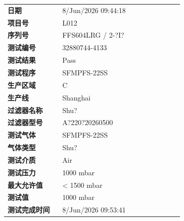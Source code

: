 \documentclass[UTF8,10pt,a4paper,fontset=fandol]{ctexart}
\newcommand{\fieldvalue}[1]{#1}
\begin{document}
\begin{tabular}{@{}p{0.28\linewidth}p{0.62\linewidth}@{}}
\textbf{日期} &
\fieldvalue{8/Jun/2026 09:44:18}
\\
\textbf{项目号} &
\fieldvalue{L012}
\\
\textbf{序列号} &
\fieldvalue{FFS604LRG / 2-?I?}
\\
\textbf{测试编号} &
\fieldvalue{32880744-4133}
\\
\textbf{测试结果} &
\fieldvalue{Pass}
\\
\textbf{测试程序} &
\fieldvalue{SFMPFS-22SS}
\\
\textbf{生产区域} &
\fieldvalue{C}
\\
\textbf{生产线} &
\fieldvalue{Shanghai}
\\
\textbf{过滤器名称} &
\fieldvalue{Shu?}
\\
\textbf{过滤器型号} &
\fieldvalue{A?220?20260500}
\\
\textbf{测试气体} &
\fieldvalue{SFMPFS-22SS}
\\
\textbf{气体类型} &
\fieldvalue{Shu?}
\\
\textbf{测试介质} &
\fieldvalue{Air}
\\
\textbf{测试压力} &
\fieldvalue{1000 mbar}
\\
\textbf{最大允许值} &
\fieldvalue{< 1500 mbar}
\\
\textbf{测试值} &
\fieldvalue{1000 mbar}
\\
\textbf{测试完成时间} &
\fieldvalue{8/Jun/2026 09:53:41}
\\
\end{tabular}

\vspace{1em}
\end{document}
